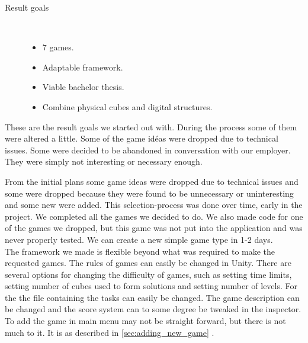 \begin{description}
	\item[Result goals]\ 
	\begin{itemize}
		\item 7 games.
		\item Adaptable framework.
		\item Viable bachelor thesis.
		\item Combine physical cubes and digital structures.
	\end{itemize}
\end{description}

These are the result goals we started out with. During the process some of them
were altered a little. Some of the game id\'eas were dropped due to technical
issues. Some were decided to be abandoned in conversation with our employer.
They were simply not interesting or necessary enough. 


From the initial plans some game ideas were dropped due to technical issues and some were dropped because they were found to be unnecessary or uninteresting and some new were added. 
This selection-process was done over time, early in the project. We completed all the games we decided to do. 
We also made code for one of the games we dropped, but this game was not put into the application and was never properly tested. 
We can create a new simple game type in 1-2 days.\\
The framework we made is flexible beyond what was required to make the requested games. 
The rules of games can easily be changed in Unity. 
There are several options for changing the difficulty of games, such as setting time limits, setting number of cubes used to form solutions and setting number of levels. 
For the \nameref{game:wo0ord_game} the file containing the tasks can easily be changed. 
The game description can be changed and the score system can to some degree be tweaked in the inspector.
To add the game in main menu may not be straight forward, but there is not
much to it. It is as described in \autoref{sec:adding_new_game}
.

